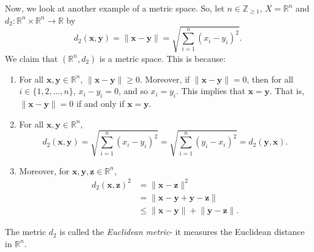 \documentclass[a4paper, openany]{memoir}
\theoremstyle{definition}
\theoremstyle{plain}
\begin{document}
\noindent Now, we look at another example of a metric space. So, let $n \in \mathbb{Z}_{\geqslant 1}$, $X = \mathbb{R}^n$ and $d_2: \mathbb{R}^n \times \mathbb{R}^n \to \mathbb{R}$ by
\[d_2(\bm{x}, \bm{y}) = \lVert \bm{x} - \bm{y} \rVert = \sqrt{\sum_{i=1}^n (x_i - y_i)^2}.\]
We claim that $(\mathbb{R}^n, d_2)$ is a metric space. This is because:
\begin{enumerate}[label=\textbf{M\arabic*}.]
    \item For all $\bm{x}, \bm{y} \in \mathbb{R}^n$, $\lVert \bm{x} - \bm{y} \rVert \geqslant 0$. Moreover, if $\lVert \bm{x} - \bm{y} \rVert = 0$, then for all $i \in \{1, 2, \dots, n\}$, $x_i - y_i = 0$, and so $x_i = y_i$. This implies that $\bm{x} = \bm{y}$. That is, $\lVert \bm{x} - \bm{y} \rVert = 0$ if and only if $\bm{x} = \bm{y}$.
    
    \item For all $\bm{x}, \bm{y} \in \mathbb{R}^n$,
    \[d_2(\bm{x}, \bm{y}) = \sqrt{\sum_{i=1}^n (x_i - y_i)^2} = \sqrt{\sum_{i=1}^n (y_i - x_i)^2} = d_2(\bm{y}, \bm{x}).\]
    
    \item Moreover, for $\bm{x}, \bm{y}, \bm{z} \in \mathbb{R}^n$,
    \begin{align*}
        d_2(\bm{x}, \bm{z})^2 &= \lVert \bm{x} - \bm{z} \rVert^2 \\
        &= \lVert \bm{x} - \bm{y} + \bm{y} - \bm{z} \rVert \\
        &\leqslant \lVert \bm{x} - \bm{y} \rVert + \lVert \bm{y} - \bm{z} \rVert.
    \end{align*}
\end{enumerate}
The metric $d_2$ is called the \emph{Euclidean metric}- it measures the Euclidean distance in $\mathbb{R}^n$.
\end{document}
